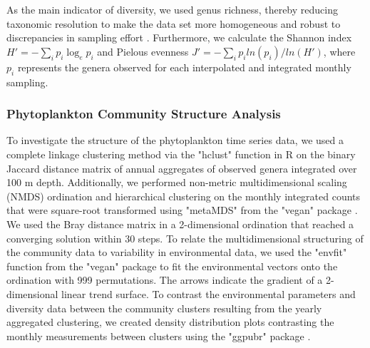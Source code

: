 \documentclass[draft]{agujournal2019}
\begin{document}
    As the main indicator of diversity, we used genus richness, thereby reducing taxonomic resolution to make the data set more homogeneous and robust to discrepancies in sampling effort \cite{ptacnik_diversity_2008}. Furthermore, we calculate the Shannon index $H' = -\sum_i p_i \log_{e} p_i$ and Pielou\textquotesingle s evenness $J' = -\sum_i p_i ln( p_i )/ln(H')$, where $p_i$ represents the genera observed for each interpolated and integrated monthly sampling. 

      
    \subsubsection{Phytoplankton Community Structure Analysis}
    To investigate the structure of the phytoplankton time series data, we used a complete linkage clustering method via the "hclust" function in R \cite{r_core_team_r_2024} on the binary Jaccard distance matrix of annual aggregates of observed genera integrated over 100 m depth. Additionally, we performed non-metric multidimensional scaling (NMDS) ordination and hierarchical clustering on the monthly integrated counts that were square-root transformed using "metaMDS" from the "vegan" package \cite{oksanen_vegan_2024}. We used the Bray distance matrix in a 2-dimensional ordination that reached a converging solution within 30 steps. To relate the multidimensional structuring of the community data to variability in environmental data, we used the "envfit" function from the "vegan" package to fit the environmental vectors onto the ordination with 999 permutations. The arrows indicate the gradient of a 2-dimensional linear trend surface. 
    To contrast the environmental parameters and diversity data between the community clusters resulting from the yearly aggregated clustering, we created density distribution plots contrasting the monthly measurements between clusters using the "ggpubr" package \cite{kassambara_ggpubr_2023}. %

        
\end{document}
